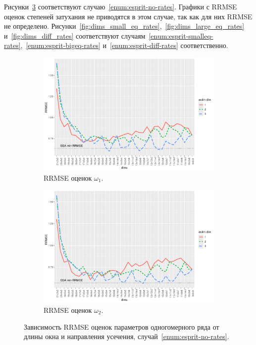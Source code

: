 \documentclass[specialist,
  substylefile=spbu_report.rtx,
subf,href,colorlinks=true, 12pt]{disser}
\theoremstyle{plain}
\theoremstyle{definition}
\theoremstyle{remark}
\begin{document}
Рисунки~\ref{fig:dims_no_rates} соответствуют случаю~\ref{enum:esprit-no-rates}.
Графики с RRMSE оценок степеней затухания не приводятся в этом случае, так как для них RRMSE не определено.
Рисунки~\ref{fig:dims_small_eq_rates},~\ref{fig:dims_large_eq_rates} и~\ref{fig:dims_diff_rates}
соответствуют случаям~\ref{enum:esprit-smalleq-rates},~\ref{enum:esprit-bigeq-rates} и~\ref{enum:esprit-diff-rates}
соответственно.
\begin{figure}[!ht]
  \centering
  \begin{subfigure}{0.49\linewidth}
    \includegraphics[width=\linewidth]{freq1_dims_no_rates.pdf}
    \caption{RRMSE оценок $\omega_1$.}
    \label{fig:freq1_dims_no_rates}
  \end{subfigure}
  \begin{subfigure}{0.49\linewidth}
    \includegraphics[width=\linewidth]{freq2_dims_no_rates.pdf}
    \caption{RRMSE оценок $\omega_2$.}
    \label{fig:freq2_dims_no_rates}
  \end{subfigure}
  \caption{Зависимость RRMSE оценок параметров одногомерного ряда
    от длины окна и направления усечения,
  случай~\ref{enum:esprit-no-rates}.}
  \label{fig:dims_no_rates}
\end{figure}
\end{document}
